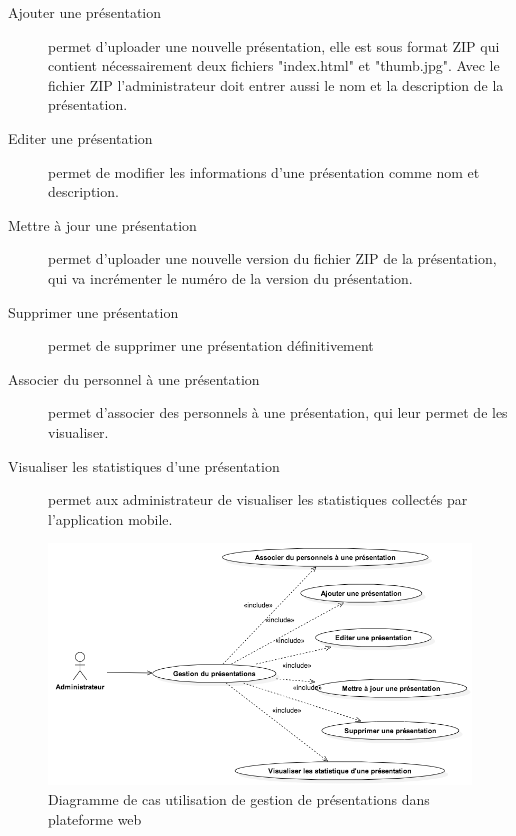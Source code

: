 \documentclass[12pt, ChapStyle1, oneside]{./Styles/Dea_Gsm}
\begin{document}
\begin{description}
  \item[Ajouter une présentation] permet d'uploader une nouvelle présentation, elle est sous format ZIP qui contient nécessairement deux fichiers "index.html" et "thumb.jpg". Avec le fichier ZIP l'administrateur doit entrer aussi le nom et la description de la présentation.
  \item[Editer une présentation] permet de modifier les informations d'une présentation comme nom et description.
  \item[Mettre à jour une présentation] permet d'uploader une nouvelle version du fichier ZIP de la présentation, qui va incrémenter le numéro de la version du présentation.
    \item[Supprimer une présentation] permet de supprimer une présentation définitivement
      \item[Associer du personnel à une présentation] permet d'associer des personnels à une présentation, qui leur permet de les visualiser.
      \item[Visualiser les statistiques d'une présentation] permet aux administrateur de visualiser les statistiques collectés par l'application mobile.
\end{description}
\begin{figure}[H]
    \centering
    \includegraphics[width=5.0in]{UseCaseGestionPresentations}
    \caption{Diagramme de cas utilisation de gestion de présentations dans plateforme web}
    \label{UseCaseDiagramWeb}
\end{figure}
\end{document}
